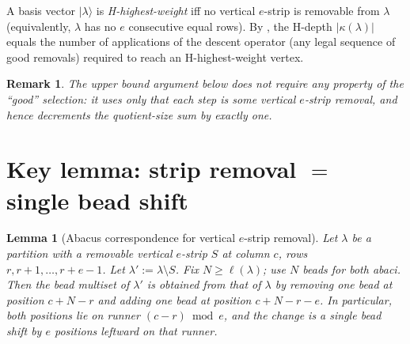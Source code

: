 \documentclass[11pt]{article}
\newtheorem{lemma}[theorem]{Lemma}
\newtheorem{remark}[theorem]{Remark}
\theoremstyle{definition}
\begin{document}
A basis vector $|\lambda\rangle$ is \emph{H-highest-weight} iff no vertical
$e$-strip is removable from $\lambda$ (equivalently, $\lambda$ has no $e$
consecutive equal rows). By \cite[Prop.~3.12(4)]{Gerber}, the H-depth
$|\kappa(\lambda)|$ equals the number of applications of the descent operator
(any legal sequence of good removals) required to reach an H-highest-weight
vertex.

\begin{remark}
The upper bound argument below does not require any property of the ``good''
selection: it uses only that each step is \emph{some} vertical $e$-strip removal,
and hence decrements the quotient-size sum by exactly one.
\end{remark}

\section{Key lemma: strip removal $=$ single bead shift}
\label{sec:key-lemma}

\begin{lemma}[Abacus correspondence for vertical $e$-strip removal]
\label{lem:abacus}
Let $\lambda$ be a partition with a removable vertical $e$-strip $S$ at column
$c$, rows $r, r+1, \ldots, r+e-1$. Let $\lambda' := \lambda \setminus S$. Fix
$N \ge \ell(\lambda)$; use $N$ beads for both abaci. Then the bead multiset
of $\lambda'$ is obtained from that of $\lambda$ by removing one bead at
position $c + N - r$ and adding one bead at position $c + N - r - e$. In
particular, both positions lie on runner $(c - r) \bmod e$, and the change is
a single bead shift by $e$ positions leftward on that runner.
\end{lemma}
\end{document}
